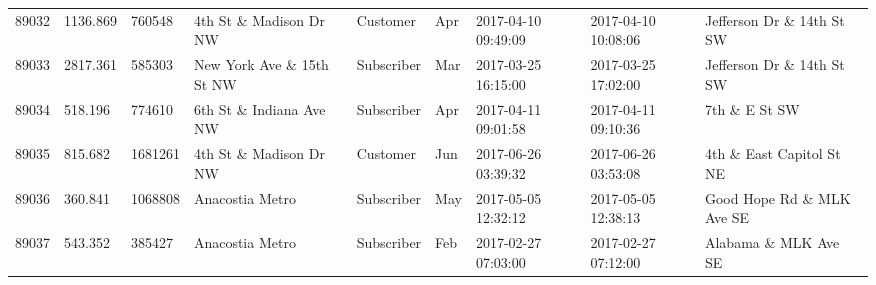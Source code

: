 \documentclass[11pt]{article}
\begin{document}
\begin{tabular}{r|llllllll}
	89032 & 1136.869                                           &  760548                                            & 4th St \& Madison Dr NW                           & Customer                                           & Apr                                                & 2017-04-10 09:49:09                                & 2017-04-10 10:08:06                                & Jefferson Dr \& 14th St SW                       \\
	89033 & 2817.361                                           &  585303                                            & New York Ave \& 15th St NW                        & Subscriber                                         & Mar                                                & 2017-03-25 16:15:00                                & 2017-03-25 17:02:00                                & Jefferson Dr \& 14th St SW                       \\
	89034 &  518.196                                           &  774610                                            & 6th St \& Indiana Ave NW                          & Subscriber                                         & Apr                                                & 2017-04-11 09:01:58                                & 2017-04-11 09:10:36                                & 7th \& E St SW                                   \\
	89035 &  815.682                                           & 1681261                                            & 4th St \& Madison Dr NW                           & Customer                                           & Jun                                                & 2017-06-26 03:39:32                                & 2017-06-26 03:53:08                                & 4th \& East Capitol St NE                        \\
	89036 &  360.841                                         & 1068808                                          & Anacostia Metro                                  & Subscriber                                       & May                                              & 2017-05-05 12:32:12                              & 2017-05-05 12:38:13                              & Good Hope Rd \& MLK Ave SE                     \\
	89037 &  543.352                                         &  385427                                          & Anacostia Metro                                  & Subscriber                                       & Feb                                              & 2017-02-27 07:03:00                              & 2017-02-27 07:12:00                              & Alabama \& MLK Ave SE                          \\

\end{tabular}
\end{document}
